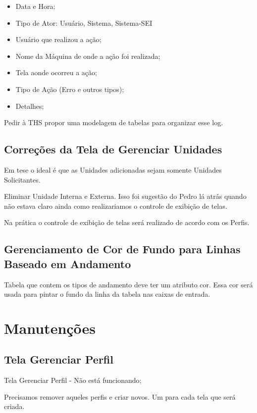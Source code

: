 \begin{itemize}
	\item Data e Hora;
	\item Tipo de Ator: Usuário, Sistema, Sistema-SEI
	\item Usuário que realizou a ação;
	\item Nome da Máquina de onde a ação foi realizada;
	\item Tela aonde ocorreu a ação;
	\item Tipo de Ação (Erro e outros tipos);
	\item Detalhes;
\end{itemize}

Pedir à THS propor uma modelagem de tabelas para organizar esse log.


\subsection{Correções da Tela de Gerenciar Unidades}

Em tese o ideal é que as Unidades adicionadas sejam somente Unidades Solicitantes.

Eliminar Unidade Interna e Externa. Isso foi sugestão do Pedro lá atrás quando não estava claro ainda como realizariamos o controle de exibição de telas.

Na prática o controle de exibição de telas será realizado de acordo com os Perfis.

\subsection{Gerenciamento de Cor de Fundo para Linhas Baseado em Andamento}

Tabela que contem os tipos de andamento deve ter um atributo cor. Essa cor será usada para pintar o fundo da linha da tabela nas caixas de entrada.





\section{Manutenções}

\subsection{Tela Gerenciar Perfil}

Tela Gerenciar Perfil - Não está funcionando;

Precisamos remover aqueles perfis e criar novos.
Um para cada tela que será criada.

